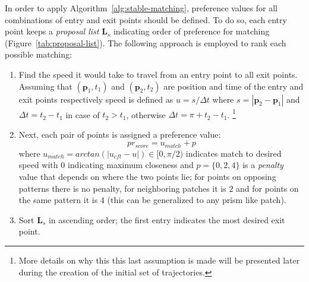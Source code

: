 In order to apply Algorithm~\ref{alg:stable-matching}, preference values for all combinations of entry and exit points should be defined.
To do so, each entry point keeps a \emph{proposal list} $\mathbf{L}_s$ indicating order of preference for matching (Figure~\ref{tab:proposal-list}).
The following approach is employed to rank each possible matching:
\begin{enumerate}
  \item Find the speed it would take to travel from an entry point to all exit points.
  Assuming that $(\mathbf{p}_1, t_1)$ and $(\mathbf{p}_2,t_2)$ are position and time of the entry and exit points respectively
  speed is defined as $u = s / {\Delta}t$ where $s=|\mathbf{p}_2-\mathbf{p}_1|$ and ${\Delta}t = t_2 - t_1$ in case
  of $t_2 > t_1$, otherwise ${\Delta}t=\pi + t_2 - t_1$.
  \footnote{More details on why this this last assumption is made will be presented later during the creation of the initial set of trajectories.}
  \item %
  Next, each pair of points is assigned a preference value:
  \begin{equation}
  	pr_{score} = u_{match} + p
  	\label{eqn:objective_function}
  \end{equation}
  where
  		$u_{match} = arctan(|u_{cft} - u|) \in [0, \pi / 2)$ indicates match to desired speed with $0$ indicating maximum closeness and 
    	$p = \{0, 2, 4\}$ is a \emph{penalty} value that depends on where the two points lie; for points on opposing patterns there is no penalty, for neighboring patches it is $2$ and for points on the same pattern it is $4$ (this can be generalized to any prism like patch). 

  \item Sort $\mathbf{L}_s$ in ascending order; the first entry indicates the most desired exit point.
\end{enumerate}
 


